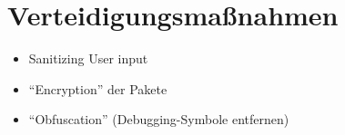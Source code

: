 \section{Verteidigungsmaßnahmen}

\begin{itemize}
    \item Sanitizing User input
    \item \enquote{Encryption} der Pakete
    \item \enquote{Obfuscation} (Debugging-Symbole entfernen)
\end{itemize}